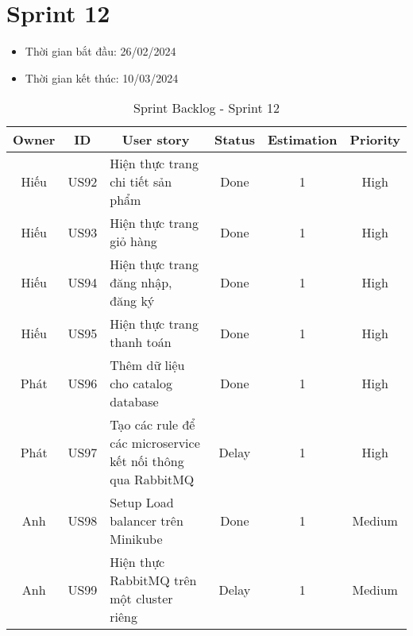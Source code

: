 \section{Sprint 12}
\begin{itemize}
    \item Thời gian bắt đầu: 26/02/2024
    \item Thời gian kết thúc: 10/03/2024
\end{itemize}
\begin{table}[H]
    \begin{tabular}{|c|c|m{6cm}|c|c|c|}
    \hline
    \textbf{Owner} & \textbf{ID} & \multicolumn{1}{c|}{\textbf{User story}}                                & \textbf{Status} & \textbf{Estimation} & \textbf{Priority} \\ \hline
    Hiếu         & US92        & Hiện thực trang chi tiết sản phẩm                    & Done            & 1                   & High         \\ \hline
    Hiếu        & US93        & Hiện thực trang giỏ hàng                     & Done            & 1                   & High         \\ \hline
    Hiếu         & US94        & Hiện thực trang đăng nhập, đăng ký                   & Done            & 1                   & High         \\ \hline
    Hiếu        & US95        & Hiện thực trang thanh toán                    & Done            & 1                   & High         \\ \hline
    Phát        & US96        & Thêm dữ liệu cho catalog database                     & Done            & 1                   & High         \\ \hline
    Phát        & US97        & Tạo các rule để các microservice kết nối thông qua RabbitMQ                     & Delay            & 1                   & High         \\ \hline
    Anh        & US98        & Setup Load balancer trên Minikube                    & Done            & 1                   & Medium         \\ \hline
    Anh        & US99        & Hiện thực RabbitMQ trên một cluster riêng                     & Delay            & 1                   & Medium         \\ \hline
    \end{tabular}
    \caption{Sprint Backlog - Sprint 12}
    \label{tab:sprint-12}
\end{table}
